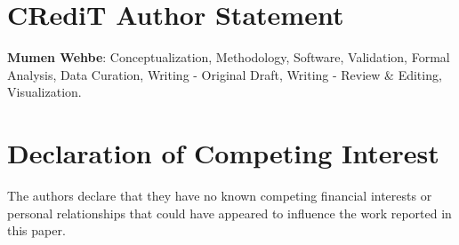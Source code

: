 \section*{CRediT Author Statement}

\textbf{Mumen Wehbe}: Conceptualization, Methodology, Software, Validation, Formal Analysis, Data Curation, Writing - Original Draft, Writing - Review \& Editing, Visualization.

\section*{Declaration of Competing Interest}

The authors declare that they have no known competing financial interests or personal relationships that could have appeared to influence the work reported in this paper.
